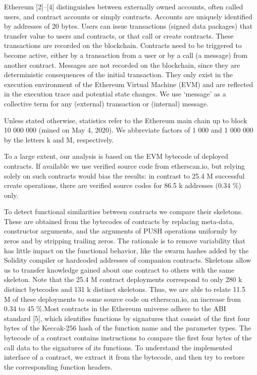 \documentclass[12pt]{article}
\begin{document}
Ethereum [2]–[4] distinguishes between externally owned
accounts, often called users, and contract accounts or simply
contracts. Accounts are uniquely identified by addresses of
20 bytes. Users can issue transactions (signed data packages)
that transfer value to users and contracts, or that call or create
contracts. These transactions are recorded on the blockchain.
Contracts need to be triggered to become active, either by a
 transaction from a user or by a call (a message) from another
contract. Messages are not recorded on the blockchain, since
they are deterministic consequences of the initial transaction.
They only exist in the execution environment of the Ethereum
Virtual Machine (EVM) and are reflected in the execution trace
and potential state changes. We use ‘message’ as a collective
term for any (external) transaction or (internal) message.\par
Unless stated otherwise, statistics refer to the Ethereum
main chain up to block 10 000 000 (mined on May 4, 2020).
We abbreviate factors of 1 000 and 1 000 000 by the letters k
and M, respectively.\par
To a large extent, our analysis is based on the EVM
bytecode of deployed contracts. If available we use verified
source code from etherscan.io, but relying solely on
such contracts would bias the results: in contrast to 25.4 M
successful create operations, there are verified source codes
for 86.5 k addresses (0.34 \%) only.\par 
To detect functional similarities between contracts we compare their skeletons. These are obtained from the bytecodes
of contracts by replacing meta-data, constructor arguments,
and the arguments of PUSH operations uniformly by zeros
and by stripping trailing zeros. The rationale is to remove
variability that has little impact on the functional behavior,
like the swarm hashes added by the Solidity compiler or hardcoded addresses of companion contracts. Skeletons allow us
to transfer knowledge gained about one contract to others with
the same skeleton. Note that the 25.4 M contract deployments
correspond to only 280 k distinct bytecodes and 131 k distinct
skeletons. Thus, we are able to relate 11.5 M of these deployments to some source code on etherscan.io, an increase
from 0.34 to 45 \%.Most contracts in the Ethereum universe adhere to the ABI
standard [5], which identifies functions by signatures that
consist of the first four bytes of the Keccak-256 hash of the
function name and the parameter types. The bytecode of a
contract contains instructions to compare the first four bytes
of the call data to the signatures of its functions. To understand
the implemented interface of a contract, we extract it from the
bytecode, and then try to restore the corresponding function
headers.
\end{document}
